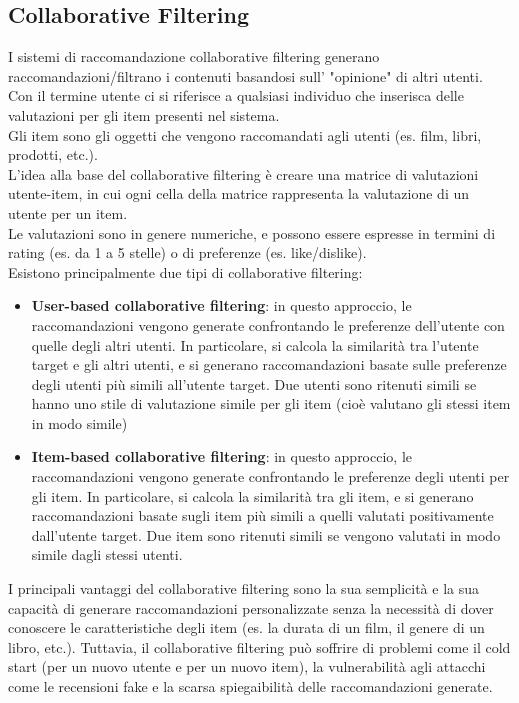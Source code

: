 \subsection{Collaborative Filtering}
I sistemi di raccomandazione collaborative filtering generano raccomandazioni/filtrano i contenuti basandosi sull' "opinione" di altri utenti.\\ Con il termine utente ci si riferisce a qualsiasi individuo che inserisca delle valutazioni per gli item presenti nel sistema. \\ Gli item sono gli oggetti che vengono raccomandati agli utenti (es. film, libri, prodotti, etc.).\\
L'idea alla base del collaborative filtering è creare una matrice di valutazioni utente-item, in cui ogni cella della matrice rappresenta la valutazione di un utente per un item.\\ Le valutazioni sono in genere numeriche, e possono essere espresse in termini di rating (es. da 1 a 5 stelle) o di preferenze (es. like/dislike).\\
Esistono principalmente due tipi di collaborative filtering:
\begin{itemize}
    \item \textbf{User-based collaborative filtering}: in questo approccio, le raccomandazioni vengono generate confrontando le preferenze dell'utente con quelle degli altri utenti. In particolare, si calcola la similarità tra l'utente target e gli altri utenti, e si generano raccomandazioni basate sulle preferenze degli utenti più simili all'utente target. Due utenti sono ritenuti simili se hanno uno stile di valutazione simile per gli item (cioè valutano gli stessi item in modo simile)
    \item \textbf{Item-based collaborative filtering}: in questo approccio, le raccomandazioni vengono generate confrontando le preferenze degli utenti per gli item. In particolare, si calcola la similarità tra gli item, e si generano raccomandazioni basate sugli item più simili a quelli valutati positivamente dall'utente target. Due item sono ritenuti simili se vengono valutati in modo simile dagli stessi utenti.
\end{itemize}
I principali vantaggi del collaborative filtering sono la sua semplicità e la sua capacità di generare raccomandazioni personalizzate senza la necessità di dover conoscere le caratteristiche degli item (es. la durata di un film, il genere di un libro, etc.). Tuttavia, il collaborative filtering può soffrire di problemi come il cold start (per un nuovo utente e per un nuovo item), la vulnerabilità agli attacchi come le recensioni fake e la scarsa spiegaibilità delle raccomandazioni generate.\\

